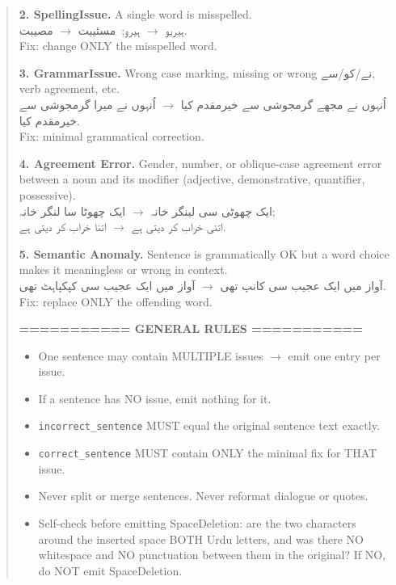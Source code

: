 \documentclass[11pt]{article}
\begin{document}
\begin{quote}
\medskip
\textbf{2. SpellingIssue.} A single word is misspelled.\\
\foreignlanguage{arabic}{ہیریو} $\rightarrow$
\foreignlanguage{arabic}{ہیرو};\
\foreignlanguage{arabic}{مسئیبت} $\rightarrow$
\foreignlanguage{arabic}{مصیبت}.\\
Fix: change ONLY the misspelled word.

\medskip
\textbf{3. GrammarIssue.} Wrong case marking,
missing or wrong
\foreignlanguage{arabic}{نے}/\foreignlanguage{arabic}{کو}/\foreignlanguage{arabic}{سے},
verb agreement, etc.\\
\foreignlanguage{arabic}{اُنہوں نے مجھے گرمجوشی سے خیرمقدم کیا}
$\rightarrow$
\foreignlanguage{arabic}{اُنہوں نے میرا گرمجوشی سے خیرمقدم کیا}.\\
Fix: minimal grammatical correction.

\medskip
\textbf{4. Agreement Error.} Gender, number, or
oblique-case agreement error between a noun and its
modifier (adjective, demonstrative, quantifier,
possessive).\\
\foreignlanguage{arabic}{ایک چھوٹی سی لینگر خانہ}
$\rightarrow$
\foreignlanguage{arabic}{ایک چھوٹا سا لنگر خانہ};\\
\foreignlanguage{arabic}{اتنی خراب کر دیتی ہے}
$\rightarrow$
\foreignlanguage{arabic}{اتنا خراب کر دیتی ہے}.

\medskip
\textbf{5. Semantic Anomaly.} Sentence is grammatically OK
but a word choice makes it meaningless or wrong in
context.\\
\foreignlanguage{arabic}{آواز میں ایک عجیب سی کانپ تھی}
$\rightarrow$
\foreignlanguage{arabic}{آواز میں ایک عجیب سی کپکپاہٹ تھی}.\\
Fix: replace ONLY the offending word.

\medskip
\textbf{=========== GENERAL RULES ===========}

\begin{itemize}
  \item One sentence may contain MULTIPLE issues
        $\rightarrow$ emit one entry per issue.
  \item If a sentence has NO issue, emit nothing for
        it.
  \item \texttt{incorrect\_sentence} MUST equal the
        original sentence text exactly.
  \item \texttt{correct\_sentence} MUST contain ONLY
        the minimal fix for THAT issue.
  \item Never split or merge sentences. Never reformat
        dialogue or quotes.
  \item Self-check before emitting SpaceDeletion: are
        the two characters around the inserted space
        BOTH Urdu letters, and was there NO whitespace
        and NO punctuation between them in the
        original? If NO, do NOT emit SpaceDeletion.
\end{itemize}


\end{quote}
\end{document}
